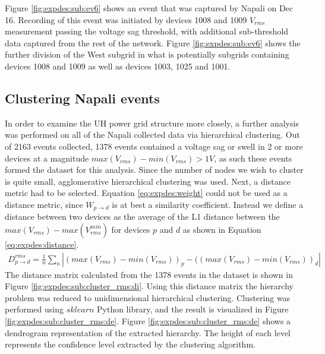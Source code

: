Figure \ref{fig:expdes:sub:ev6} shows an event that was captured by Napali on Dec 16.
Recording of this event was initiated by devices 1008 and 1009 $V_{rms}$ measurement passing the voltage sag threshold, with additional sub-threshold data captured from the rest of the network.
Figure \ref{fig:expdes:sub:ev6} shows the further division of the West subgrid in what is potentially subgrids containing devices 1008 and 1009 as well as devices 1003, 1025 and 1001.

\subsection{Clustering Napali events}\label{subsec:clustering-naplai-events}

In order to examine the UH power grid structure more closely, a further analysis was performed on all of the Napali collected data via hierarchical clustering.
Out of 2163 events collected, 1378 events contained a voltage sag or swell in 2 or more devices at a magnitude $max(V_{rms})- min(V_{rms}) > 1V$, as such these events formed the dataset for this analysis.
Since the number of nodes we wish to cluster is quite small, agglomerative hierarchical clustering was used.
Next, a distance metric had to be selected.
Equation \ref{eq:expdes:weight} could not be used as a distance metric, since  $W_{p \rightarrow d}$ is at best a similarity coefficient.
Instead we define a distance between two devices as the average of the L1 distance between the $max(V_{rms})- max(V_{rms}^{min})$ for devices $p$ and $d$ as shown in Equation \ref{eq:expdes:distance}.
\begin{equation} \label{eq:expdes:distance}
\begin{aligned}
    D_{p \rightarrow d}^{rms} = \frac{1}{n}\sum_{n}|(max(V_{rms}) - min(V_{rms}))_{p} - ((max(V_{rms}) - min(V_{rms}))_{d}|
\end{aligned}
\end{equation}
The distance matrix calculated from the 1378 events in the dataset is shown in Figure \ref{fig:expdes:sub:cluster_rms:di}.
Using this distance matrix the hierarchy problem was reduced to unidimensional hierarchical clustering.
Clustering was performed using $sklearn$ Python library, and the result is visualized in Figure \ref{fig:expdes:sub:cluster_rms:de}.
Figure \ref{fig:expdes:sub:cluster_rms:de} shows a dendrogram representation of the extracted hierarchy.
The height of each level represents the confidence level extracted by the clustering algorithm.

